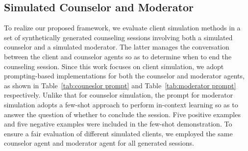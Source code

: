 \subsection{Simulated Counselor and Moderator}

To realize our proposed framework, we evaluate client simulation methods in a set of synthetically generated counseling sessions involving both a simulated counselor and a simulated moderator. The latter manages the conversation between the client and counselor agents so as to determine when to end the counseling session. Since this work focuses on client simulation, we adopt prompting-based implementations for both the counselor and moderator agents, as shown in Table~\ref{tab:couneslor prompt} and Table~\ref{tab:moderator prompt} respectively. Unlike that for counselor simulation, the prompt for moderator simulation adopts a few-shot approach to perform in-context learning so as to answer the question of whether to conclude the session.  Five positive examples and five negative examples were included in the few-shot demonstration. To ensure a fair evaluation of different simulated clients, we employed the same counselor agent and moderator agent for all generated sessions. 



